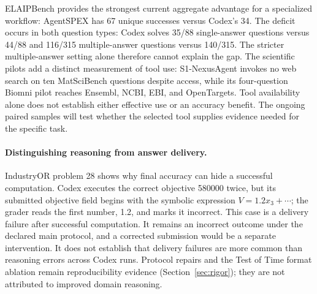 ELAIPBench provides the strongest current aggregate advantage for a specialized workflow:
AgentSPEX has 67 unique successes versus Codex's 34. The deficit occurs in both question types:
Codex solves 35/88 single-answer questions versus 44/88 and 116/315 multiple-answer questions
versus 140/315. The stricter multiple-answer setting alone therefore cannot explain the gap.
The scientific pilots add a distinct measurement of tool use: S1-NexusAgent invokes no web search
on ten MatSciBench questions despite access, while its four-question Biomni pilot reaches
Ensembl, NCBI, EBI, and OpenTargets. Tool availability alone does not establish either effective
use or an accuracy benefit. The ongoing paired samples will test whether the selected tool
supplies evidence needed for the specific task.

\paragraph{Distinguishing reasoning from answer delivery.}
IndustryOR problem 28 shows why final accuracy can hide a successful computation. Codex executes
the correct objective 580000 twice, but its submitted objective field begins with the symbolic
expression $V=1.2x_3+\cdots$; the grader reads the first number, 1.2, and marks it incorrect.
This case is a delivery failure after successful computation. It remains an incorrect outcome
under the declared main protocol, and a corrected submission would be a separate intervention.
It does not establish that delivery failures are more common than reasoning errors across Codex
runs.  Protocol repairs and the Test of Time format ablation remain reproducibility evidence
(Section~\ref{sec:rigor}); they are not attributed to improved domain reasoning.
